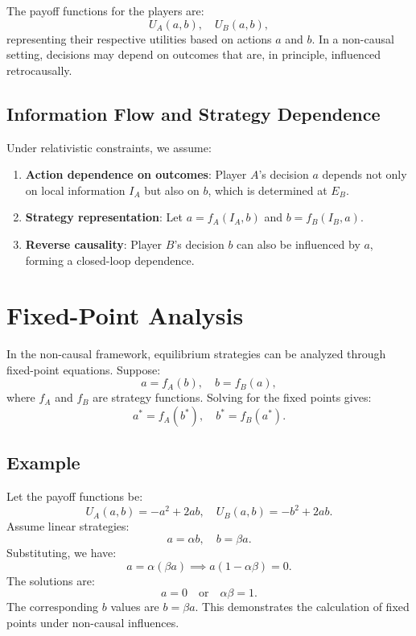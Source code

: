 \documentclass{article}
\begin{document}
The payoff functions for the players are:
\begin{equation}
    U_A(a, b), \quad U_B(a, b),
\end{equation}
representing their respective utilities based on actions $a$ and $b$. In a non-causal setting, decisions may depend on outcomes that are, in principle, influenced retrocausally.

\subsection{Information Flow and Strategy Dependence}
Under relativistic constraints, we assume:
\begin{enumerate}
    \item \textbf{Action dependence on outcomes}: Player $A$'s decision $a$ depends not only on local information $I_A$ but also on $b$, which is determined at $E_B$.
    \item \textbf{Strategy representation}: Let $a = f_A(I_A, b)$ and $b = f_B(I_B, a)$.
    \item \textbf{Reverse causality}: Player $B$'s decision $b$ can also be influenced by $a$, forming a closed-loop dependence.
\end{enumerate}

\section{Fixed-Point Analysis}
In the non-causal framework, equilibrium strategies can be analyzed through fixed-point equations. Suppose:
\begin{equation}
    a = f_A(b), \quad b = f_B(a),
\end{equation}
where $f_A$ and $f_B$ are strategy functions. Solving for the fixed points gives:
\begin{equation}
    a^* = f_A(b^*), \quad b^* = f_B(a^*).
\end{equation}

\subsection{Example}
Let the payoff functions be:
\begin{equation}
    U_A(a, b) = -a^2 + 2ab, \quad U_B(a, b) = -b^2 + 2ab.
\end{equation}
Assume linear strategies:
\begin{equation}
    a = \alpha b, \quad b = \beta a.
\end{equation}
Substituting, we have:
\begin{equation}
    a = \alpha (\beta a) \implies a(1 - \alpha \beta) = 0.
\end{equation}
The solutions are:
\begin{equation}
    a = 0 \quad \text{or} \quad \alpha \beta = 1.
\end{equation}
The corresponding $b$ values are $b = \beta a$. This demonstrates the calculation of fixed points under non-causal influences.
\end{document}

